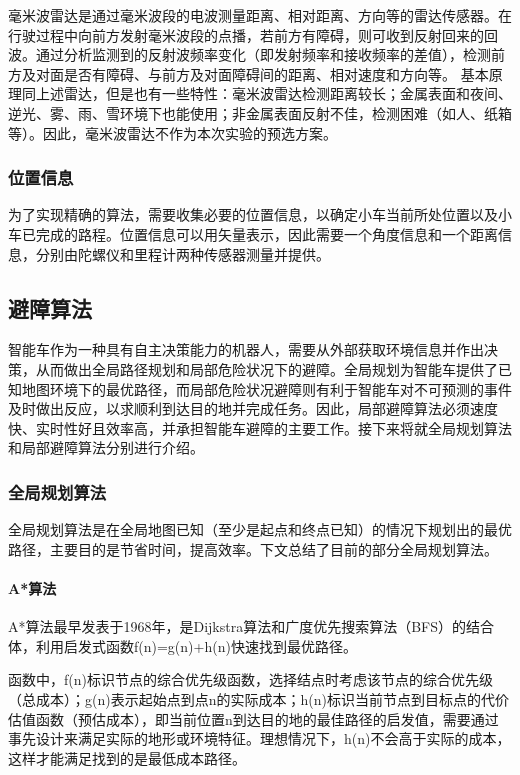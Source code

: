 \documentclass{report}
\begin{document}
 毫米波雷达是通过毫米波段的电波测量距离、相对距离、方向等的雷达传感器。在行驶过程中向前方发射毫米波段的点播，若前方有障碍，则可收到反射回来的回波。通过分析监测到的反射波频率变化（即发射频率和接收频率的差值），检测前方及对面是否有障碍、与前方及对面障碍间的距离、相对速度和方向等。
基本原理同上述雷达，但是也有一些特性：毫米波雷达检测距离较长；金属表面和夜间、逆光、雾、雨、雪环境下也能使用；非金属表面反射不佳，检测困难（如人、纸箱等）。因此，毫米波雷达不作为本次实验的预选方案\cite{jh2}。

  \subsubsection{位置信息}
  \label{subsec:label}
为了实现精确的算法，需要收集必要的位置信息，以确定小车当前所处位置以及小车已完成的路程。位置信息可以用矢量表示，因此需要一个角度信息和一个距离信息，分别由陀螺仪和里程计两种传感器测量并提供。

\subsection{避障算法}
\label{subsec:label}
智能车作为一种具有自主决策能力的机器人，需要从外部获取环境信息并作出决策，从而做出全局路径规划和局部危险状况下的避障。全局规划为智能车提供了已知地图环境下的最优路径，而局部危险状况避障则有利于智能车对不可预测的事件及时做出反应，以求顺利到达目的地并完成任务。因此，局部避障算法必须速度快、实时性好且效率高，并承担智能车避障的主要工作。接下来将就全局规划算法和局部避障算法分别进行介绍。

\subsubsection{全局规划算法}
\label{subsec:label}
全局规划算法是在全局地图已知（至少是起点和终点已知）的情况下规划出的最优路径，主要目的是节省时间，提高效率。下文总结了目前的部分全局规划算法。
\paragraph{A*算法}
A*算法最早发表于1968年，是Dijkstra算法和广度优先搜索算法（BFS）的结合体，利用启发式函数f(n)=g(n)+h(n)快速找到最优路径。

函数中，f(n)标识节点的综合优先级函数，选择结点时考虑该节点的综合优先级（总成本）；g(n)表示起始点到点n的实际成本；h(n)标识当前节点到目标点的代价估值函数（预估成本），即当前位置n到达目的地的最佳路径的启发值，需要通过事先设计来满足实际的地形或环境特征。理想情况下，h(n)不会高于实际的成本，这样才能满足找到的是最低成本路径。
\end{document}

